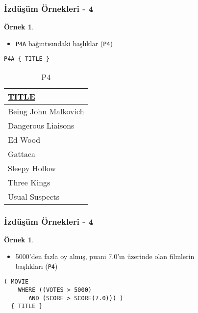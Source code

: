 \documentclass[dvipsnames]{beamer}
\theoremstyle{definition}
\theoremstyle{example}
\newtheorem{ornek}[theorem]{Örnek}
\theoremstyle{plain}
\begin{document}
\begin{frame}[fragile]
  \frametitle{İzdüşüm Örnekleri - 4}

  \begin{ornek}
    \begin{itemize}
      \item \texttt{P4A} bağıntısındaki başlıklar (\texttt{P4})
    \end{itemize}

    \begin{lstlisting}
P4A { TITLE }
    \end{lstlisting}

    \pause
    \vspace{-10pt}
    \begin{tiny}
    \begin{table}
      \caption{P4}
      \begin{tabular}{|l|}\hline
\underline{TITLE}   \\[2pt]\hline\hline
Being John Malkovich\\\hline
Dangerous Liaisons  \\\hline
Ed Wood             \\\hline
Gattaca             \\\hline
Sleepy Hollow       \\\hline
Three Kings         \\\hline
Usual Suspects      \\\hline
      \end{tabular}
    \end{table}
    \end{tiny}
  \end{ornek}
\end{frame}

\begin{frame}[fragile]
  \frametitle{İzdüşüm Örnekleri - 4}

  \begin{ornek}
    \begin{itemize}
      \item 5000'den fazla oy almış, puanı 7.0'ın üzerinde olan filmlerin\\
        başlıkları (\texttt{P4})
    \end{itemize}

    \begin{lstlisting}
( MOVIE
    WHERE ((VOTES > 5000)
       AND (SCORE > SCORE(7.0))) )
  { TITLE }
    \end{lstlisting}
  \end{ornek}
\end{frame}
\end{document}
